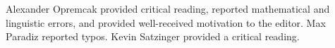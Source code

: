 
Alexander Opremcak provided critical reading, reported mathematical and linguistic errors, and provided well-received motivation to the editor.
Max Paradiz reported typos.
Kevin Satzinger provided a critical reading.
